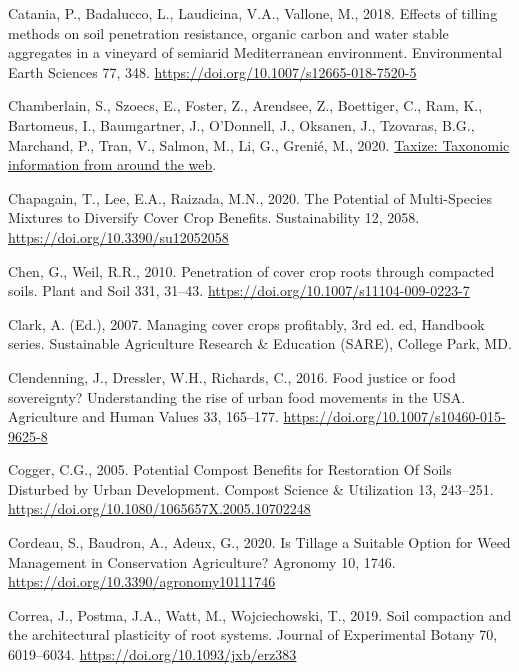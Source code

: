\documentclass[
  12pt,
]{article}
\newlength{\cslhangindent}
\newlength{\cslentryspacingunit} %
\newenvironment{CSLReferences}[2] %
 {%
  \setlength{\parindent}{0pt}
  \ifodd #1
  \let\oldpar\par
  \def\par{\hangindent=\cslhangindent\oldpar}
  \fi
  \setlength{\parskip}{#2\cslentryspacingunit}
 }%
 {}
\begin{document}
\begin{CSLReferences}{1}{0}
\leavevmode{}%
Catania, P., Badalucco, L., Laudicina, V.A., Vallone, M., 2018. Effects of tilling methods on soil penetration resistance, organic carbon and water stable aggregates in a vineyard of semiarid {Mediterranean} environment. Environmental Earth Sciences 77, 348. \url{https://doi.org/10.1007/s12665-018-7520-5}

\leavevmode{}%
Chamberlain, S., Szoecs, E., Foster, Z., Arendsee, Z., Boettiger, C., Ram, K., Bartomeus, I., Baumgartner, J., O'Donnell, J., Oksanen, J., Tzovaras, B.G., Marchand, P., Tran, V., Salmon, M., Li, G., Grenié, M., 2020. \href{https://github.com/ropensci/taxize}{Taxize: Taxonomic information from around the web}.

\leavevmode{}%
Chapagain, T., Lee, E.A., Raizada, M.N., 2020. The {Potential} of {Multi-Species Mixtures} to {Diversify Cover Crop Benefits}. Sustainability 12, 2058. \url{https://doi.org/10.3390/su12052058}

\leavevmode{}%
Chen, G., Weil, R.R., 2010. Penetration of cover crop roots through compacted soils. Plant and Soil 331, 31--43. \url{https://doi.org/10.1007/s11104-009-0223-7}

\leavevmode{}%
Clark, A. (Ed.), 2007. Managing cover crops profitably, 3rd ed. ed, Handbook series. {Sustainable Agriculture Research \& Education (SARE)}, {College Park, MD}.

\leavevmode{}%
Clendenning, J., Dressler, W.H., Richards, C., 2016. Food justice or food sovereignty? {Understanding} the rise of urban food movements in the {USA}. Agriculture and Human Values 33, 165--177. \url{https://doi.org/10.1007/s10460-015-9625-8}

\leavevmode{}%
Cogger, C.G., 2005. Potential {Compost Benefits} for {Restoration Of Soils Disturbed} by {Urban Development}. Compost Science \& Utilization 13, 243--251. \url{https://doi.org/10.1080/1065657X.2005.10702248}

\leavevmode{}%
Cordeau, S., Baudron, A., Adeux, G., 2020. Is {Tillage} a {Suitable Option} for {Weed Management} in {Conservation Agriculture}? Agronomy 10, 1746. \url{https://doi.org/10.3390/agronomy10111746}

\leavevmode{}%
Correa, J., Postma, J.A., Watt, M., Wojciechowski, T., 2019. Soil compaction and the architectural plasticity of root systems. Journal of Experimental Botany 70, 6019--6034. \url{https://doi.org/10.1093/jxb/erz383}


\end{CSLReferences}
\end{document}
